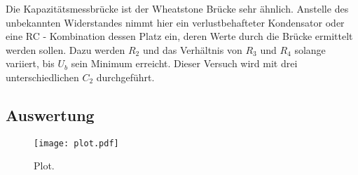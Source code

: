 Die Kapazitätsmessbrücke ist der Wheatstone Brücke sehr ähnlich. 
Anstelle des unbekannten Widerstandes nimmt hier ein verlustbehafteter
Kondensator oder eine RC - Kombination dessen Platz ein, deren Werte 
durch die Brücke ermittelt werden sollen. 
Dazu werden $R_2$ und das Verhältnis von $R_3$ und $R_4$ solange
variiert, bis $U_b$ sein Minimum erreicht. Dieser Versuch wird
mit drei unterschiedlichen $C_2$ durchgeführt.

\subsection{Auswertung}
\label{subsec:Auswertung}


\begin{figure}
  \centering
  \texttt{[image: plot.pdf]}
  \caption{Plot.}
  \label{fig:plot}
\end{figure}